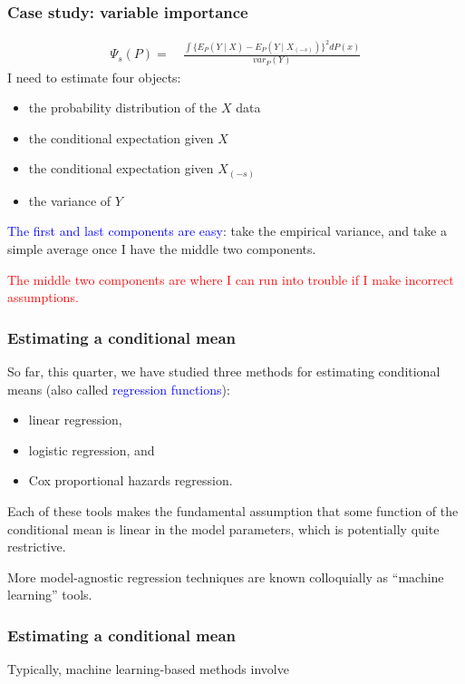 \documentclass[12pt, 
hyperref={colorlinks=true, linkcolor=blue, urlcolor=cyan}]{beamer}
\begin{document}
\begin{frame}
\frametitle{Case study: variable importance}
\vspace{-0.75cm}
\begin{align*}
\Psi_s(P) = &\ \frac{\int \{E_P(Y \mid X) - E_P(Y \mid X_{(-s)})\}^2 dP(x)}{var_P(Y)}
\end{align*}
\vspace{-0.4cm}
I need to estimate four objects:
\begin{itemize}
\item the probability distribution of the $X$ data
\item the conditional expectation given $X$
\item the conditional expectation given $X_{(-s)}$
\item the variance of $Y$
\end{itemize}

\textcolor{blue}{The first and last components are easy}: take the empirical variance, and take a simple average once I have the middle two components.

\textcolor{red}{The middle two components are where I can run into trouble if I make incorrect assumptions. }
\end{frame}

\begin{frame}
\frametitle{Estimating a conditional mean}
So far, this quarter, we have studied three methods for estimating conditional means (also called \textcolor{blue}{regression functions}):
\begin{itemize}
\item linear regression,
\item logistic regression, and
\item Cox proportional hazards regression.
\end{itemize}

Each of these tools makes the fundamental assumption that some function of the conditional mean is linear in the model parameters, which is potentially quite restrictive.

More model-agnostic regression techniques are known colloquially as ``machine learning'' tools.
\end{frame}

\begin{frame}
\frametitle{Estimating a conditional mean}
Typically, machine learning-based methods involve 

\end{frame}





\end{document}
